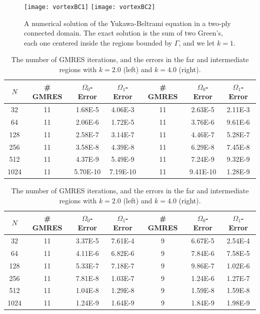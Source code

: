 \documentclass[final]{siamltex}
\begin{document}
\begin{figure}[htps]
  \texttt{[image: vortexBC1]}
  \texttt{[image: vortexBC2]}
\caption{\label{f:twoply} A numerical solution of the Yukawa-Beltrami
equation in a two-ply connected domain.  The exact solution is the sum
of two Green's, each one centered inside the regions bounded by
$\Gamma$, and we let $k=1$.}
\end{figure}


\begin{table}[htps]
\centering

\begin{tabular}{c|ccc|ccc}
$N$ & \# GMRES & $\Omega_{0}$-Error & $\Omega_{1}$-Error 
    & \# GMRES & $\Omega_{0}$-Error & $\Omega_{1}$-Error \\
\hline
32   & 11 & 1.68E-5  & 4.06E-3  
     & 11 & 2.63E-5  & 2.11E-3 \\
64   & 11 & 2.06E-6  & 1.72E-5  
     & 11 & 3.76E-6  & 9.61E-6 \\
128  & 11 & 2.58E-7  & 3.14E-7 
     & 11 & 4.46E-7  & 5.28E-7 \\
256  & 11 & 3.58E-8  & 4.39E-8  
     & 11 & 6.29E-8  & 7.45E-8 \\
512  & 11 & 4.37E-9  & 5.49E-9  
     & 11 & 7.24E-9  & 9.32E-9 \\
1024 & 11 & 5.70E-10 & 7.19E-10 
     & 11 & 9.41E-10 & 1.28E-9 \\
\end{tabular}
\caption{\label{t:example1a} The number of GMRES iterations, and the
errors in the far and intermediate regions with $k = 0.51$ (left) and
$k=1.0$ (right).}

\begin{tabular}{c|ccc|ccc}
$N$ & \# GMRES & $\Omega_{0}$-Error & $\Omega_{1}$-Error 
    & \# GMRES & $\Omega_{0}$-Error & $\Omega_{1}$-Error \\
\hline
32   & 11 & 3.37E-5 & 7.61E-4  
     & 9  & 6.67E-5 & 2.54E-4 \\
64   & 11 & 4.11E-6 & 6.82E-6  
     & 9  & 7.84E-6 & 7.58E-5 \\
128  & 11 & 5.33E-7 & 7.18E-7 
     & 9  & 9.86E-7 & 1.02E-6 \\
256  & 11 & 7.81E-8 & 1.03E-7  
     & 9  & 1.24E-6 & 1.27E-7 \\
512  & 11 & 1.04E-8 & 1.29E-8  
     & 9  & 1.59E-8 & 1.59E-8 \\
1024 & 11 & 1.24E-9 & 1.64E-9 
     & 9  & 1.84E-9 & 1.98E-9 \\
\end{tabular}
\caption{\label{t:example1b} The number of GMRES iterations, and the
errors in the far and intermediate regions with $k = 2.0$ (left) and
$k=4.0$ (right).}


\end{table}
\end{document}
